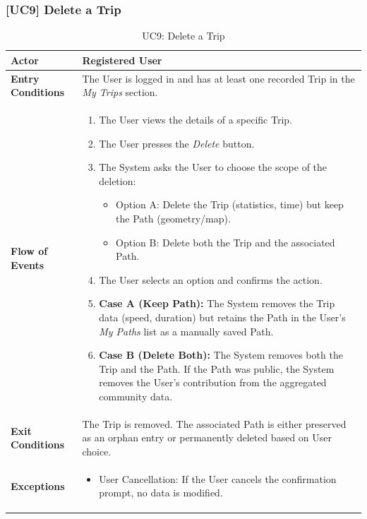 \subsubsection*{[UC9] Delete a Trip}
\begin{table}[H]
    \sf
    \small
    \centering
    \renewcommand{\arraystretch}{1.5}
    \begin{tabularx}{\textwidth}{|l|X|}
        \hline
        \cellcolor{lightgray} \textbf{Actor} & Registered User \\ 
        \hline
        \cellcolor{lightgray} \textbf{Entry Conditions} & The User is logged in and has at least one recorded Trip in the \emph{My Trips} section. \\ 
        \hline
        \cellcolor{lightgray} \textbf{Flow of Events} & 
        \begin{enumerate}[leftmargin=*, before=\vspace*{-\baselineskip}]
            \item The User views the details of a specific Trip.
            \item The User presses the \emph{Delete} button.
            \item The System asks the User to choose the scope of the deletion:
                \begin{itemize}
                    \item Option A: Delete the Trip (statistics, time) but keep the Path (geometry/map).
                    \item Option B: Delete both the Trip and the associated Path.
                \end{itemize}
            \item The User selects an option and confirms the action.
            \item \textbf{Case A (Keep Path):} The System removes the Trip data (speed, duration) but retains the Path in the User's \emph{My Paths} list as a manually saved Path.
            \item \textbf{Case B (Delete Both):} The System removes both the Trip and the Path. If the Path was public, the System removes the User's contribution from the aggregated community data.
        \end{enumerate}
        \\ 
        \hline
        \cellcolor{lightgray} \textbf{Exit Conditions} & The Trip is removed. The associated Path is either preserved as an orphan entry or permanently deleted based on User choice. \\ 
        \hline
        \cellcolor{lightgray} \textbf{Exceptions} &
        \begin{itemize}[leftmargin=*, before=\vspace*{-\baselineskip}]
            \item User Cancellation: If the User cancels the confirmation prompt, no data is modified.
        \end{itemize}
        \\ 
        \hline
    \end{tabularx}
    \caption{UC9: Delete a Trip}
\end{table}
